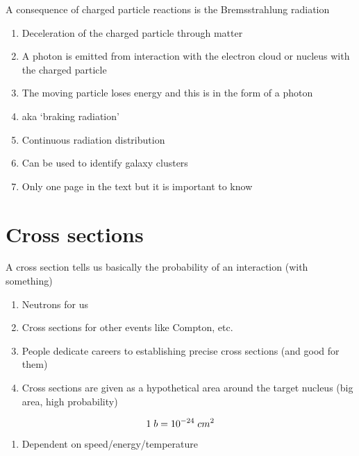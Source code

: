\documentclass[aspectratio=1610,pdftex,dvipsnames,compress,xcolor={dvipsnames}]{beamer}
\begin{document}
\addtocounter{framenumber}{-1} 
\begin{frame}{A consequence of charged particle reactions is the Bremsstrahlung radiation}
    \begin{enumerate}[series=outerlist,topsep=0pt,itemsep=21pt,leftmargin=*,label=(\arabic*)]
        \item[]Deceleration of the charged particle through matter
        \item[]A photon is emitted from interaction with the electron cloud or nucleus with the charged particle
        \item[]The moving particle loses energy and this is in the form of a photon
        \item[]aka `braking radiation'
        \item[]Continuous radiation distribution
        \item[]Can be used to identify galaxy clusters
        \item[]Only one page in the text but it is important to know
    \end{enumerate}
\end{frame}


\section{Cross sections}


\addtocounter{framenumber}{-1} 
\begin{frame}{A cross section tells us basically the probability of an interaction (with something)}
    \begin{enumerate}[series=outerlist,topsep=0pt,itemsep=21pt,leftmargin=*,label=(\arabic*)]
        \item[]Neutrons for us
        \item[]Cross sections for other events like Compton, etc.
        \item[]People dedicate careers to establishing precise cross sections (and good for them)
        \item[]Cross sections are given as a hypothetical area  around the target nucleus (big area, high probability)
    \end{enumerate}

    \vspace*{\fill}

    \begin{equation}
        \LARGE
        1 \; b = 10^{-24} \; cm^2
    \end{equation}

    \vspace*{\fill}

    \begin{enumerate}[series=outerlist,topsep=0pt,itemsep=21pt,leftmargin=*,label=(\arabic*)]
        \item[]Dependent on speed/energy/temperature
    \end{enumerate}
\end{frame}
\end{document}
